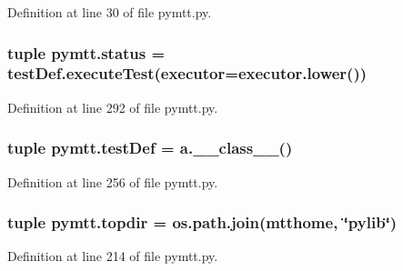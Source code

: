 Definition at line 30 of file pymtt.\-py.

\hypertarget{namespacepymtt_a1a2fd13626c1c2d248cedc138e8660ec}{
\subsubsection[{status}]{\setlength{\rightskip}{0pt plus 5cm}tuple pymtt.\-status = test\-Def.\-execute\-Test({\bf executor}=executor.\-lower())}}\label{namespacepymtt_a1a2fd13626c1c2d248cedc138e8660ec}


Definition at line 292 of file pymtt.\-py.

\hypertarget{namespacepymtt_afebe539e6104da8ebd3d06b7a0e77fe7}{
\subsubsection[{test\-Def}]{\setlength{\rightskip}{0pt plus 5cm}tuple pymtt.\-test\-Def = a.\-\_\-\-\_\-class\-\_\-\-\_\-()}}\label{namespacepymtt_afebe539e6104da8ebd3d06b7a0e77fe7}


Definition at line 256 of file pymtt.\-py.

\hypertarget{namespacepymtt_ac673c895b8c93a029d2a1655c04af315}{
\subsubsection[{topdir}]{\setlength{\rightskip}{0pt plus 5cm}tuple pymtt.\-topdir = os.\-path.\-join({\bf mtthome}, \char`\"{}pylib\char`\"{})}}\label{namespacepymtt_ac673c895b8c93a029d2a1655c04af315}


Definition at line 214 of file pymtt.\-py.

